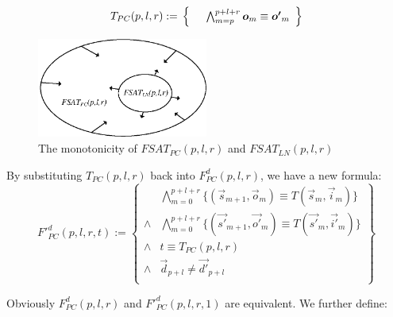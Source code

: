 \documentclass[runningheads,a4paper,orivec]{llncs}
\begin{document}
\begin{equation}\label{tpc}
T_{PC}(p,l,r):=\\
\left\{
\begin{array}{cc}
      &\bigwedge_{m=p}^{p+l+r}\vec{o}_m\equiv \vec{o'}_m \\
\end{array}
\right\}
\end{equation}

\begin{figure}[t]
\begin{center}
\includegraphics[width=0.5\textwidth]{mono}
\end{center}
\caption{The monotonicity of $FSAT_{PC}(p,l,r)$ and $FSAT_{LN}(p,l,r)$}
  \label{fig_mono}
\end{figure}

By substituting $T_{PC}(p,l,r)$ back into $F^d_{PC}(p,l,r)$,
we have a new formula:
\begin{equation}\label{fpcq}
F'^d_{PC}(p,l,r,t):=
\left\{
\begin{array}{cc}
&\bigwedge_{m=0}^{p+l+r}
\{
(\vec{s}_{m+1},\vec{o}_m)\equiv T(\vec{s}_m,\vec{i}_m)
\}
\\
\wedge&\bigwedge_{m=0}^{p+l+r}
\{
(\vec{s'}_{m+1},\vec{o'}_m)\equiv T(\vec{s'}_m,\vec{i'}_m)
\}
\\
\wedge& t\equiv T_{PC}(p,l,r)\\
\wedge& \vec{d}_{p+l}\ne \vec{d'}_{p+l} \\
\end{array}
\right\}
\end{equation}


Obviously $F^d_{PC}(p,l,r)$ and $F'^d_{PC}(p,l,r,1)$ are equivalent.
We further define:
\end{document}
